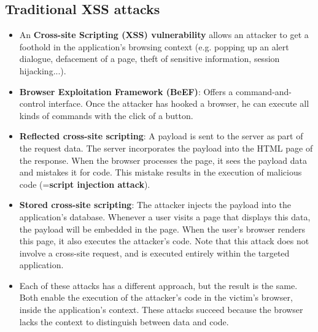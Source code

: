 \documentclass[../main.tex]{subfiles}
\begin{document}
\subsection{Traditional XSS attacks}
\begin{itemize}
\item An \textbf{Cross-site Scripting (XSS) vulnerability} allows an attacker to get a foothold in the application's browsing context (e.g. popping up an alert dialogue, defacement of a page, theft of sensitive information, session hijacking...).
\item \textbf{Browser Exploitation Framework (BeEF)}:  Offers a command-and-control interface. Once the attacker has hooked a browser, he can execute all kinds of commands with the click of a button.
\item \textbf{Reflected cross-site scripting}: A payload is sent to the server as part of the request data. The server incorporates the payload into the HTML page of the response. When the browser processes the page, it sees the payload data and mistakes it for code. This mistake results in the execution of malicious code (=\textbf{script injection attack}).
\item \textbf{Stored cross-site scripting}: The attacker injects the payload into the application's database. Whenever a user visits a page that displays this data, the payload will be embedded in the page. When the user's browser renders this page, it also executes the attacker's code. Note that this attack does not involve a cross-site request, and is executed entirely within the targeted application.
\item Each of these attacks has a different approach, but the result is the same. Both enable the execution of the attacker's code in the victim's browser, inside the application's context. These attacks succeed because the browser lacks the context to distinguish between data and code.
\end{itemize}
\end{document}
